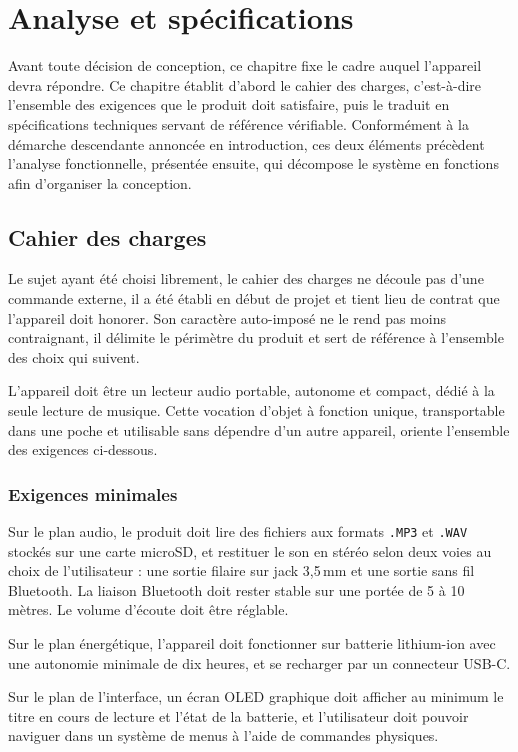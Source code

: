 \chapter{Analyse et spécifications}
\label{chap:analyse}
Avant toute décision de conception, ce chapitre fixe le cadre auquel l'appareil devra répondre. Ce chapitre établit d'abord le cahier des charges, c'est-à-dire l'ensemble des exigences que le produit doit satisfaire, puis le traduit en spécifications techniques servant de référence vérifiable. Conformément à la démarche descendante annoncée en introduction, ces deux éléments précèdent l'analyse fonctionnelle, présentée ensuite, qui décompose le système en fonctions afin d'organiser la conception.

\section{Cahier des charges}
Le sujet ayant été choisi librement, le cahier des charges ne découle pas d'une commande externe, il a été établi en début de projet et tient lieu de contrat que l'appareil doit honorer. Son caractère auto-imposé ne le rend pas moins contraignant, il délimite le périmètre du produit et sert de référence à l'ensemble des choix qui suivent.

L'appareil doit être un lecteur audio portable, autonome et compact, dédié à la seule lecture de musique. Cette vocation d'objet à fonction unique, transportable dans une poche et utilisable sans dépendre d'un autre appareil, oriente l'ensemble des exigences ci-dessous.

\subsection{Exigences minimales}
Sur le plan audio, le produit doit lire des fichiers aux formats \texttt{.MP3} et \texttt{.WAV} stockés sur une carte microSD, et restituer le son en stéréo selon deux voies au choix de l'utilisateur : une sortie filaire sur jack 3,5\,mm et une sortie sans fil Bluetooth. La liaison Bluetooth doit rester stable sur une portée de 5 à 10 mètres. Le volume d'écoute doit être réglable.

Sur le plan énergétique, l'appareil doit fonctionner sur batterie lithium-ion avec une autonomie minimale de dix heures, et se recharger par un connecteur USB-C.

Sur le plan de l'interface, un écran OLED graphique doit afficher au minimum le titre en cours de lecture et l'état de la batterie, et l'utilisateur doit pouvoir naviguer dans un système de menus à l'aide de commandes physiques.

